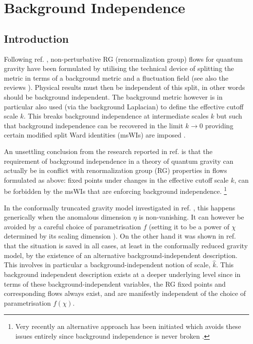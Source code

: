 \documentclass[11pt,draft]{book} %
\begin{document}

\chapter{Background Independence}


\section{Introduction}
\label{sec:introduction}

Following ref. \cite{Reuter:1996cp},
non-perturbative RG (renormalization group) flows for quantum gravity have been formulated
by utilising the technical device of splitting the metric in terms of a background metric
and a fluctuation field (see also the reviews
\cite{Reuter:2012id, Percacci:2011fr, Niedermaier:2006wt, Nagy:2012ef, Litim:2011cp}).
Physical results must then be independent of this split, in other words should be background independent.
The background metric however is in particular also used (via the background Laplacian)
to define the effective cutoff scale $k$.
This breaks background independence at intermediate scales $k$ but such that background
independence can be recovered in the limit $k\to0$ providing certain modified split Ward
identities (msWIs) are imposed
\cite{Pawlowski:2005xe, Litim:2002hj, Bridle:2013sra, Reuter:1997gx, Litim:1998nf, Litim:2002ce,
Manrique:2009uh, Manrique:2010mq, Manrique:2010am, Dietz:2015owa, Safari:2015dva}.

An unsettling conclusion from the research reported in ref. \cite{Dietz:2015owa} is that the
requirement of background independence in a theory of quantum gravity can actually be
in conflict with renormalization group (RG) properties in flows formulated as above:
fixed points under changes in the effective cutoff scale $k$, can be forbidden by the msWIs
that are enforcing background independence.%
\footnote{Very recently an alternative approach has been initiated which avoids
these issues entirely since background independence is never broken \cite{Morris:2016nda}.}

In the conformally truncated gravity model investigated in ref. \cite{Dietz:2015owa},
this happens generically when the anomalous dimension $\eta$ is non-vanishing.
It can however be avoided by a careful choice of parametrisation $f$
(setting it to be a power of $\chi$ determined by its scaling dimension \cite{Dietz:2015owa}).
On the other hand it was shown in ref. \cite{Dietz:2015owa} that the situation is saved in all cases,
at least in the conformally reduced gravity model,
by the existence of an alternative background-independent description.
This involves in particular a background-independent notion of scale, $\hat{k}$.
This background independent description exists at a deeper underlying level since in terms
of these background-independent variables, the RG fixed points and corresponding flows always exist,
and are manifestly independent of the choice of parametrisation $f(\chi)$.
\end{document}
